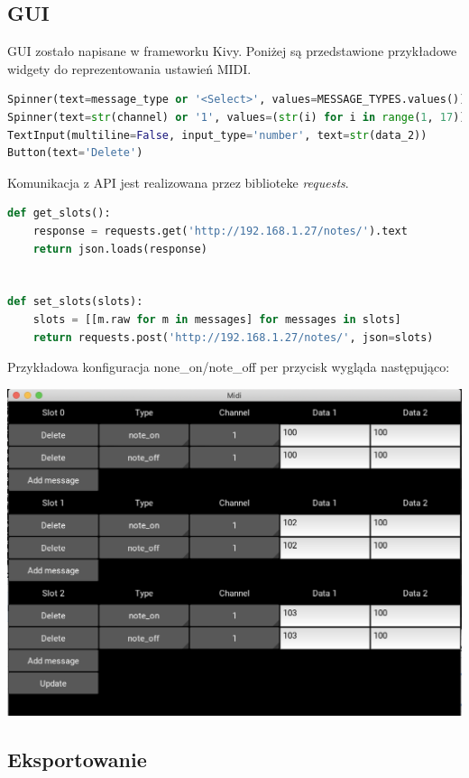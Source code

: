 \documentclass[eng,printmode]{mgr}
\begin{document}
\subsection{GUI}

GUI zostało napisane w frameworku Kivy. Poniżej są przedstawione przykładowe widgety do reprezentowania ustawień MIDI.

\begin{lstlisting}[language=Python, breaklines=true]
Spinner(text=message_type or '<Select>', values=MESSAGE_TYPES.values())
Spinner(text=str(channel) or '1', values=(str(i) for i in range(1, 17)))
TextInput(multiline=False, input_type='number', text=str(data_2))
Button(text='Delete')
\end{lstlisting}

Komunikacja z API jest realizowana przez biblioteke \textit{requests}.

\begin{lstlisting}[language=Python]
def get_slots():
    response = requests.get('http://192.168.1.27/notes/').text
    return json.loads(response)


def set_slots(slots):
    slots = [[m.raw for m in messages] for messages in slots]
    return requests.post('http://192.168.1.27/notes/', json=slots)
\end{lstlisting}

Przykładowa konfiguracja none\_on/note\_off per przycisk wygląda następująco:

\includegraphics[width=\textwidth]{gui}

\subsection{Eksportowanie}
\end{document}
